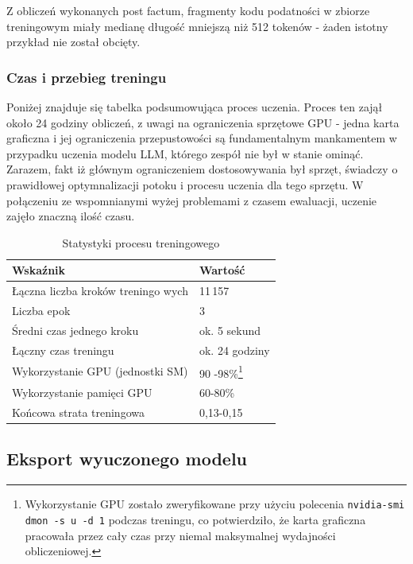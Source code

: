 \documentclass[12pt,a4paper]{article}
\begin{document}
Z obliczeń wykonanych post factum, fragmenty kodu podatności w zbiorze treningowym miały medianę długość mniejszą niż 512 tokenów - żaden istotny przykład nie został obcięty.

\subsubsection{Czas i przebieg treningu}

Poniżej znajduje się tabelka podsumowująca proces uczenia. Proces ten zajął około 24 godziny obliczeń, z uwagi na ograniczenia sprzętowe GPU - jedna karta graficzna 
i jej ograniczenia przepustowości są fundamentalnym mankamentem w przypadku uczenia modelu LLM, którego zespół nie był w stanie ominąć. Zarazem, fakt iż głównym ograniczeniem
dostosowywania był sprzęt, świadczy o prawidłowej optymnalizacji potoku i procesu uczenia dla tego sprzętu.
W połączeniu ze wspomnianymi wyżej problemami z czasem ewaluacji, uczenie zajęło znaczną ilość czasu. 

\begin{table}[H]
    \centering
    \begin{tabular}{ll}
        \toprule
        \textbf{Wskaźnik}                   & \textbf{Wartość} \\
        \midrule
        Łączna liczba kroków treningo wych  & 11\,157 \\
        Liczba epok                         & 3 \\
        Średni czas jednego kroku           & ok. 5 sekund \\
        Łączny czas treningu                & ok. 24 godziny \\
        Wykorzystanie GPU (jednostki SM)    & 90 -98\%\footnote{Wykorzystanie GPU zostało zweryfikowane przy użyciu polecenia
\texttt{nvidia-smi dmon -s u -d 1} podczas treningu, co potwierdziło, że karta
graficzna pracowała przez cały czas przy niemal maksymalnej wydajności obliczeniowej.}  \\
        Wykorzystanie pamięci GPU           & 60-80\% \\
        Końcowa strata treningowa           & 0,13-0,15 \\
        \bottomrule
    \end{tabular}
    \caption{Statystyki procesu treningowego}
\end{table}



\subsection{Eksport wyuczonego modelu}
\label{ssec:model_export}
\end{document}
